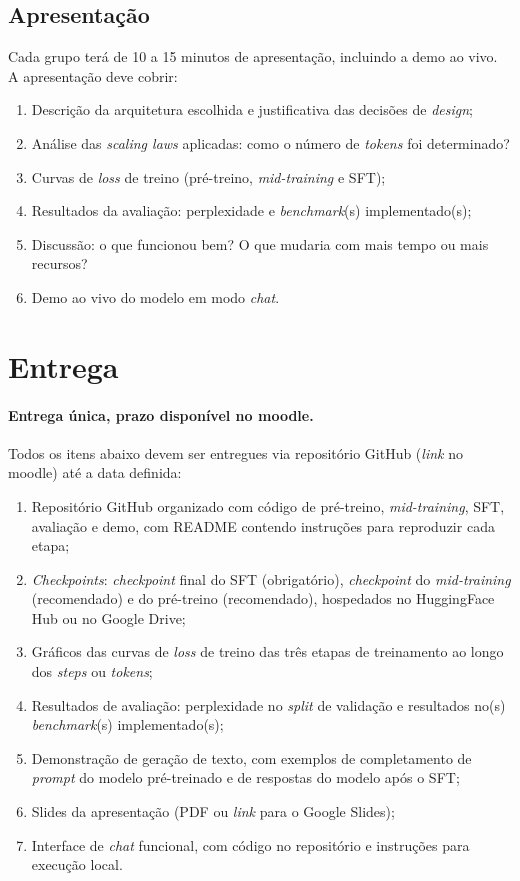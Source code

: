 \documentclass{dlproblemset}
\begin{document}
\subsection*{Apresentação}

Cada grupo terá de 10 a 15 minutos de apresentação, incluindo a demo ao vivo. A apresentação deve cobrir:

\begin{enumerate}[1)]
    \item Descrição da arquitetura escolhida e justificativa das decisões de \textit{design};
    \item Análise das \textit{scaling laws} aplicadas: como o número de \textit{tokens} foi determinado?
    \item Curvas de \textit{loss} de treino (pré-treino, \textit{mid-training} e SFT);
    \item Resultados da avaliação: perplexidade e \textit{benchmark}(s) implementado(s);
    \item Discussão: o que funcionou bem? O que mudaria com mais tempo ou mais recursos?
    \item Demo ao vivo do modelo em modo \textit{chat}.
\end{enumerate}

\section*{Entrega}

\paragraph{Entrega única, prazo disponível no moodle.} Todos os itens abaixo devem ser entregues via repositório GitHub (\textit{link} no moodle) até a data definida:

\begin{enumerate}[1)]
    \item Repositório GitHub organizado com código de pré-treino, \textit{mid-training}, SFT, avaliação e demo, com README contendo instruções para reproduzir cada etapa;
    \item \textit{Checkpoints}: \textit{checkpoint} final do SFT (obrigatório), \textit{checkpoint} do \textit{mid-training} (recomendado) e do pré-treino (recomendado), hospedados no HuggingFace Hub ou no Google Drive;
    \item Gráficos das curvas de \textit{loss} de treino das três etapas de treinamento ao longo dos \textit{steps} ou \textit{tokens};
    \item Resultados de avaliação: perplexidade no \textit{split} de validação e resultados no(s) \textit{benchmark}(s) implementado(s);
    \item Demonstração de geração de texto, com exemplos de completamento de \textit{prompt} do modelo pré-treinado e de respostas do modelo após o SFT;
    \item Slides da apresentação (PDF ou \textit{link} para o Google Slides);
    \item Interface de \textit{chat} funcional, com código no repositório e instruções para execução local.
\end{enumerate}
\end{document}

